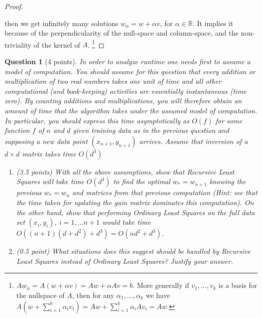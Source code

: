 \documentclass[12pt]{article}
\newcommand{\real}{\mathbb{R}}
\newtheorem{question}{Question}
\begin{document}
\begin{proof}
{\begin{indent}
  \end{indent}
  }
  then we get infinitely many solutions $w_{\alpha} = w + \alpha v$, for $\alpha \in \real$. It implies it because of the perpendicularity of the null-space and column-space, and the non-triviality of the kernel of $A$.
  \footnote{
  $Aw_{\alpha} = A(w + \alpha v) = Aw + \alpha Av = b$. More generally if $v_1, \dots, v_k$ is a basis for the nullspace of $A$, then for any $\alpha_1, \dots, \alpha_k$ we have
  $A(w+\sum\limits_{i=1}^k \alpha_iv_i) = Aw + \sum\limits_{i=1}^k \alpha_i Av_i = Aw$.
  }
\end{proof}
\newpage
\begin{question}[4 points]
  In order to analyze runtime one needs first to assume a model of computation.  You should assume for this question that every addition or multiplication of two real numbers takes one unit of time and all other computational (and book-keeping) activities are essentially instantaneous (time  zero). By  counting  additions and multiplications, you  will therefore obtain an amount of time that the algorithm takes under the assumed model of computation. In particular, you should express this time asymptotically as $O(f)$ for some function $f$ of $n$ and $d$ given training data as in the previous question and supposing a new data point $(x_{n+1}, y_{n+1})$ arrives.  Assume that inversion of a $d \times d$ matrix takes time $O(d^3)$
  \begin{enumerate}
  \item (3.5 points) With all the above assumptions, show that Recursive Least Squares will take time $O(d^3)$ to find the optimal $w_{*} = w_{n+1}$ knowing the previous $w_{*}=w_n$ and matrices from that previous computation (Hint:  see that the time taken for updating the gain matrix dominates this computation). On the other hand, show that performing Ordinary Least Squares on the full data set $(x_i, y_i)$, $ i= 1, . . . n+ 1$ would take time $O((n+ 1)(d+d^2) +d^3) =O(nd^2+d^3)$.
  \item
    (0.5 point) What situations does this suggest should be handled by Recursive Least Squares instead of Ordinary Least Squares?  Justify your answer.
  \end{enumerate}
\end{question}
\end{document}
